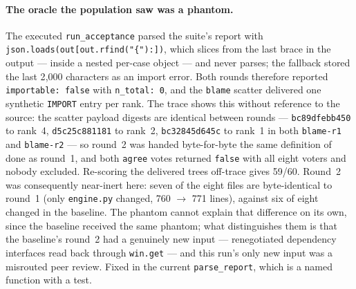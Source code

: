 \documentclass[11pt]{article}
\begin{document}
\paragraph{The oracle the population saw was a phantom.} The executed \texttt{run\_acceptance}
parsed the suite's report with \texttt{json.loads(out[out.rfind("\{"):])}, which slices from the
last brace in the output --- inside a nested per-case object --- and never parses; the fallback
stored the last 2{,}000 characters as an import error. Both rounds therefore reported
\texttt{importable: false} with \texttt{n\_total: 0}, and the \texttt{blame} scatter delivered one
synthetic \texttt{IMPORT} entry per rank. The trace shows this without reference to the source: the
scatter payload digests are identical between rounds --- \texttt{bc89dfebb450} to rank~4,
\texttt{d5c25c881181} to rank~2, \texttt{bc32845d645c} to rank~1 in both \texttt{blame-r1} and
\texttt{blame-r2} --- so round~2 was handed byte-for-byte the same definition of done as round~1,
and both \texttt{agree} votes returned \texttt{false} with all eight voters and nobody excluded.
Re-scoring the delivered trees off-trace gives 59/60. Round~2 was consequently near-inert here:
seven of the eight files are byte-identical to round~1 (only \texttt{engine.py} changed, 760
$\rightarrow$ 771 lines), against six of eight changed in the baseline. The phantom cannot explain
that difference on its own, since the baseline received the same phantom; what distinguishes them
is that the baseline's round~2 had a genuinely new input --- renegotiated dependency interfaces
read back through \texttt{win.get} --- and this run's only new input was a misrouted peer review.
Fixed in the current \texttt{parse\_report}, which is a named function with a test.
\end{document}
